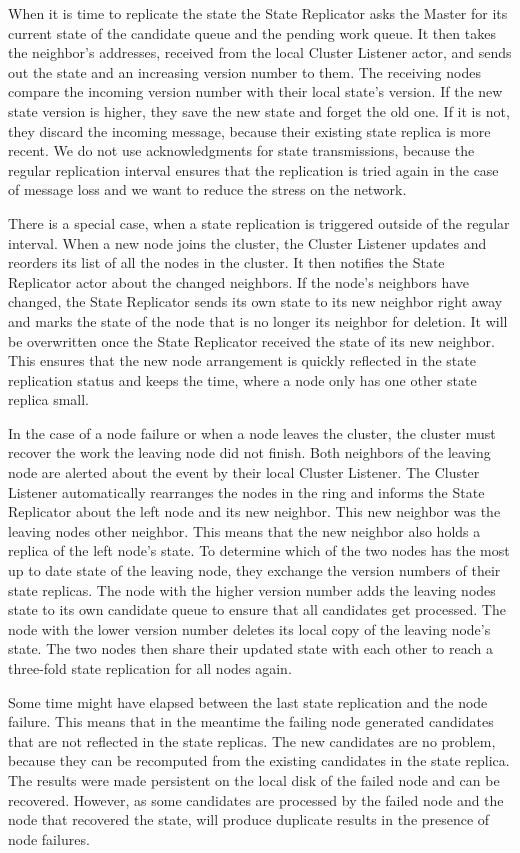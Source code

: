  When it is time to replicate the state the State Replicator asks the Master for its current state of the candidate queue and the pending work queue.
  It then takes the neighbor's addresses, received from the local Cluster Listener actor, and sends out the state and an increasing version number to them.
  The receiving nodes compare the incoming version number with their local state's version.
  If the new state version is higher, they save the new state and forget the old one.
  If it is not, they discard the incoming message, because their existing state replica is more recent.
  We do not use acknowledgments for state transmissions, because the regular replication interval ensures that the replication is tried again in the case of message loss and we want to reduce the stress on the network.

  There is a special case, when a state replication is triggered outside of the regular interval.
  When a new node joins the cluster, the Cluster Listener updates and reorders its list of all the nodes in the cluster.
  It then notifies the State Replicator actor about the changed neighbors.
  If the node's neighbors have changed, the State Replicator sends its own state to its new neighbor right away and marks the state of the node that is no longer its neighbor for deletion.
  It will be overwritten once the State Replicator received the state of its new neighbor.
  This ensures that the new node arrangement is quickly reflected in the state replication status and keeps the time, where a node only has one other state replica small.

  In the case of a node failure or when a node leaves the cluster, the cluster must recover the work the leaving node did not finish.
  Both neighbors of the leaving node are alerted about the event by their local Cluster Listener.
  The Cluster Listener automatically rearranges the nodes in the ring and informs the State Replicator about the left node and its new neighbor.
  This new neighbor was the leaving nodes other neighbor.
  This means that the new neighbor also holds a replica of the left node's state.
  To determine which of the two nodes has the most up to date state of the leaving node, they exchange the version numbers of their state replicas.
  The node with the higher version number adds the leaving nodes state to its own candidate queue to ensure that all candidates get processed.
  The node with the lower version number deletes its local copy of the leaving node's state.
  The two nodes then share their updated state with each other to reach a three-fold state replication for all nodes again.

  Some time might have elapsed between the last state replication and the node failure.
  This means that in the meantime the failing node generated candidates that are not reflected in the state replicas.
  The new candidates are no problem, because they can be recomputed from the existing candidates in the state replica.
  The results were made persistent on the local disk of the failed node and can be recovered.
  However, as some candidates are processed by the failed node and the node that recovered the state, \dodo{} will produce duplicate results in the presence of node failures.
